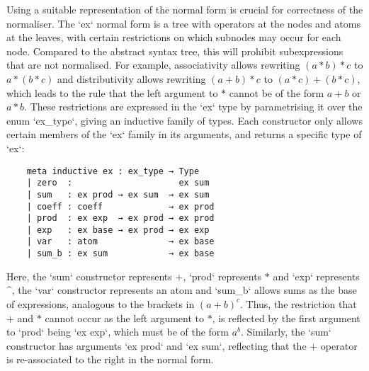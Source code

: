 \documentclass{article}
\begin{document}

Using a suitable representation of the normal form is crucial for correctness of the normaliser.
The `ex` normal form is a tree with operators at the nodes and atoms at the leaves,
with certain restrictions on which subnodes may occur for each node.
Compared to the abstract syntax tree, this will prohibit subexpressions that are not normalised.
For example, associativity allows rewriting $(a * b) * c$ to $a * (b * c)$ and distributivity allows rewriting $(a + b) * c$ to $(a * c) + (b * c)$,
which leads to the rule that the left argument to $*$ cannot be of the form $a + b$ or $a * b$.
These restrictions are expressed in the `ex` type by parametrising it over the enum `ex\_type`,
giving an inductive family of types.
Each constructor only allows certain members of the `ex` family in its arguments,
and returns a specific type of `ex`:

\begin{lstlisting}
	meta inductive ex : ex_type → Type
	| zero  :                     ex sum
	| sum   : ex prod → ex sum  → ex sum
	| coeff : coeff             → ex prod
	| prod  : ex exp  → ex prod → ex prod
	| exp   : ex base → ex prod → ex exp
	| var   : atom              → ex base
	| sum_b : ex sum            → ex base
\end{lstlisting}

Here, the `sum` constructor represents $+$, `prod` represents $*$ and `exp` represents $\^$,
the `var` constructor represents an atom and `sum\_b` allows sums as the base of expressions, analogous to the brackets in $(a + b) ^ c$.
Thus, the restriction that $+$ and $*$ cannot occur as the left argument to $*$,
is reflected by the first argument to `prod` being `ex exp`, which must be of the form $a ^ b$.
Similarly, the `sum` constructor has arguments `ex prod` and `ex sum`, reflecting that the $+$ operator is re-associated to the right in the normal form.
\end{document}
